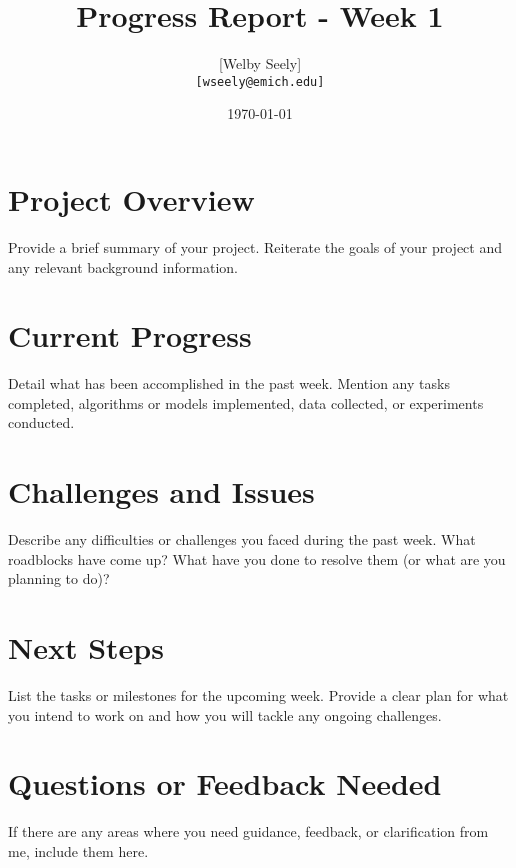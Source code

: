 \documentclass{article}
\title{Progress Report - Week 1}
\author{
  [Welby Seely] \\
  \texttt{[wseely@emich.edu]}
}
\date{\today}
\begin{document}
\maketitle



\section*{Project Overview}
Provide a brief summary of your project. Reiterate the goals of your project and any relevant background information.

\section*{Current Progress}
Detail what has been accomplished in the past week. Mention any tasks completed, algorithms or models implemented, data collected, or experiments conducted.

\section*{Challenges and Issues}
Describe any difficulties or challenges you faced during the past week. What roadblocks have come up? What have you done to resolve them (or what are you planning to do)?

\section*{Next Steps}
List the tasks or milestones for the upcoming week. Provide a clear plan for what you intend to work on and how you will tackle any ongoing challenges.

\section*{Questions or Feedback Needed}
If there are any areas where you need guidance, feedback, or clarification from me, include them here.



\end{document}
